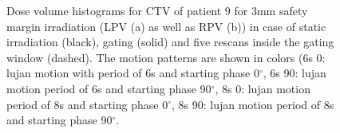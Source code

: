 \documentclass[type=dr, dr=rernat, accentcolor=tud7b,colorbacktitle, bigchapter, openright, twoside, 12pt ]{tudthesis}
\begin{document}
\begin{figure}[H]
\begin{center}
{ }
\caption{Dose volume histograms for CTV of patient 9 for 3mm safety margin irradiation (LPV (a) as well as RPV (b)) in case of static 
irradiation (black), gating (solid) and five rescans inside the gating window (dashed). The motion patterns are shown in colors (6s 0: lujan motion with period of 6s 
and starting phase 0$^{\circ}$, 6s 90: lujan motion period of 6s and starting phase 90$^{\circ}$, 8s 0: lujan motion period of 8s 
and starting phase 0$^{\circ}$, 8s 90: lujan motion period of 8s and starting phase 90$^{\circ}$.}
\label{dvhs_pat09_mdacc_rescan}
 \end{center}
\end{figure}

\newpage

\begin{figure}[H]
\end{figure}
\end{document}
